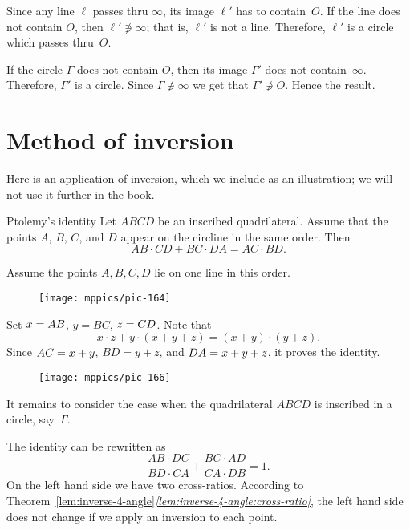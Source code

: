 Since any line $\ell$ passes thru $\infty$, its image $\ell'$ has to contain~$O$.
If the line does not contain $O$, 
then $\ell'\not\ni \infty$;
that is, $\ell'$ is not a line.
Therefore, $\ell'$ is a circle which passes thru~$O$. 

If the circle $\Gamma$ does not contain $O$, 
then its image $\Gamma'$ does not contain~$\infty$.
Therefore, $\Gamma'$ is a circle.
Since  $\Gamma\not\ni\infty$ we get that $\Gamma' \not\ni O$.
Hence the result.
\qeds

\section*{Method of inversion}

Here is an application of inversion,
which we include as an illustration;
we will not use it further in the book.

\begin{thm}{Ptolemy's identity}\label{ptolemy-id}
Let $ABCD$ be an inscribed quadrilateral.
Assume that the points $A$, $B$, $C$, and $D$ appear on the circline in the same order.
Then 
$$ AB\cdot CD+ BC\cdot DA=AC\cdot BD.$$

\end{thm}

Assume the points $A,B,C,D$ lie on one line in this order.

\begin{wrapfigure}{o}{39mm}
\centering
\texttt{[image: mppics/pic-164]}
\end{wrapfigure}

Set $x\z=AB$, $y=BC$, $z\z=CD$.
Note that
$$x\cdot z+y\cdot (x+y+z)=(x+y)\cdot(y+z).$$
Since $AC\z=x+y$, $BD=y+z$, and $DA\z=x+y+z$,
it proves the identity.

\begin{wrapfigure}{o}{39mm}
\centering
\texttt{[image: mppics/pic-166]}
\end{wrapfigure}

It remains to consider the case when the quadrilateral $ABCD$ is inscribed in a circle, say~$\Gamma$. 

The identity can be rewritten as 
$$\frac{AB\cdot DC}{ BD\cdot CA}+ \frac{BC\cdot AD}{CA\cdot DB}=1.$$
On the left hand side we have two cross-ratios.
According to Theorem~\ref{lem:inverse-4-angle}\textit{\ref{lem:inverse-4-angle:cross-ratio}}, the left hand side does not change if we apply an inversion to each point.


